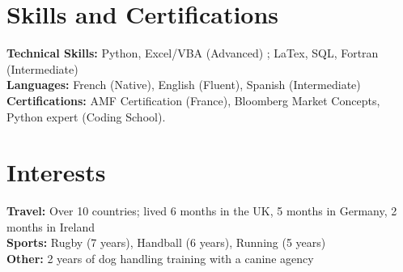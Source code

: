 \documentclass[10pt,a4paper]{article}
\begin{document}
\vspace{0.05cm}

\section*{Skills and Certifications}
\textbf{Technical Skills:} Python, Excel/VBA (Advanced) ; LaTex, SQL, Fortran (Intermediate)\\
\textbf{Languages:} French (Native), English (Fluent), Spanish (Intermediate) \\
\textbf{Certifications:} AMF Certification (France), Bloomberg Market Concepts, Python expert (Coding School).

\vspace{0.05cm}

\section*{Interests}
\textbf{Travel:} Over 10 countries; lived 6 months in the UK, 5 months in Germany, 2 months in Ireland \\
\textbf{Sports:} Rugby (7 years), Handball (6 years), Running (5 years) \\
\textbf{Other:} 2 years of dog handling training with a canine agency
\end{document}
